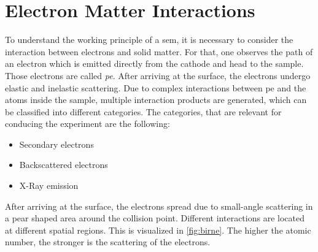 \section{Electron Matter Interactions}
To understand the working principle of a \ac{sem}, it is necessary to consider the
interaction between electrons and solid matter.
For that, one observes the path of an electron which is emitted directly from the cathode
and head to the sample. Those electrons are called \textit{\ac{pe}}.
After arriving at the surface, the electrons undergo elastic and inelastic scattering.
Due to complex interactions between \ac{pe} and the atoms
inside the sample, multiple interaction products are generated, which can
be classified into different categories.
The categories, that are relevant for conducing the experiment are the
following:
\begin{itemize}
	\item Secondary electrons
	\item Backscattered electrons
	\item X-Ray emission
\end{itemize}
After arriving at the surface, the electrons spread due to
small-angle scattering in a pear shaped area around the collision point.
Different interactions are located at different spatial regions.
This is visualized in \cref{fig:birne}.
The higher the atomic number, the stronger is the scattering of the
electrons.
